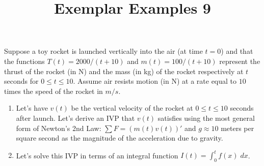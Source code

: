 \documentclass{ximera}
\begin{document}
\begin{abstract}
 \end{abstract}

    \title{Exemplar Examples 9}
    
    \maketitle

Suppose a toy rocket is launched vertically into the air (at time $t=0$) and that the functions $T(t)=2000/(t+10)$ and $m(t)=100/(t+10)$ represent the thrust of the rocket (in N) and the mass (in kg) of the rocket respectively at $t$ seconds for $0\leq t\leq 10$.  Assume air resists motion (in N) at a rate equal to $10$ times the speed of the rocket in $m/s$.   


\begin{enumerate}

\item Let's have $v(t)$ be the vertical velocity of the rocket at $0\leq t\leq 10$ seconds after launch.  Let's derive an IVP that $v(t)$ satisfies using the most general form of Newton's 2nd Law: $\displaystyle \sum F=(m(t)v(t))'$ and $g\approx 10$ meters per square second as the magnitude of the acceleration due to gravity.




 \vfill


 \item Let's solve this IVP in terms of an integral function $I(t)=\displaystyle \int_{0}^{t}f(x)\;dx$.












\end{enumerate}
\end{document}
